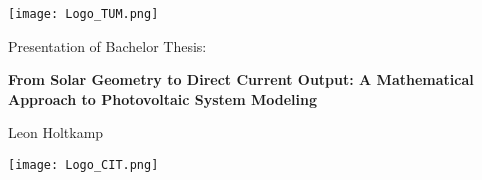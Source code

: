 \begin{frame}
    \begin{center}

        \texttt{[image: Logo\_TUM.png]}

        \vspace{0.5cm}
        
        Presentation of Bachelor Thesis:

        \vspace*{0.5cm}
        
        \textbf{From Solar Geometry to Direct Current Output: A Mathematical Approach to Photovoltaic System Modeling} 
            
        \vspace{0.5cm}
        
        Leon Holtkamp

        \vspace{0.6cm}
        
        \texttt{[image: Logo\_CIT.png]}
    \end{center}
\end{frame}